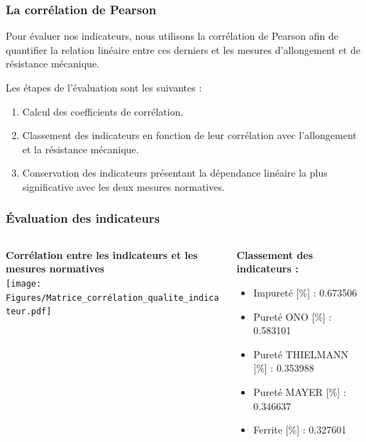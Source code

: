 \documentclass[aspectratio=169]{beamer}
\begin{document}

\begin{frame}
\frametitle{La corrélation de Pearson}

Pour évaluer nos indicateurs, nous utilisons la corrélation de Pearson afin de quantifier la relation linéaire entre ces derniers et les mesures d'allongement et de résistance mécanique.

\vspace{10pt}
Les étapes de l'évaluation sont les suivantes :
\vspace{5pt}

\begin{enumerate}
\item Calcul des coefficients de corrélation.
\item Classement des indicateurs en fonction de leur corrélation avec l'allongement et la résistance mécanique.
\item Conservation des indicateurs présentant la dépendance linéaire la plus significative avec les deux mesures normatives.
\end{enumerate}

\end{frame}

\begin{frame}
\frametitle{Évaluation des indicateurs }
\begin{columns}[t]
  \begin{column}{0.5\textwidth}
    \centering
    \textbf{Corrélation entre les indicateurs et les mesures normatives} \\
    \texttt{[image: Figures/Matrice\_corrélation\_qualite\_indicateur.pdf]} 
  \end{column}
  \begin{column}{0.5\textwidth}
   \textbf{ Classement des indicateurs :}
    \begin{itemize}
      \item Impureté [\%] : 0.673506
      \item Pureté ONO [\%] : 0.583101
      \item Pureté THIELMANN [\%] : 0.353988
      \item Pureté MAYER [\%] : 0.346637
      \item Ferrite [\%] : 0.327601
    \end{itemize}
  \end{column}
\end{columns}
\end{frame}
\end{document}
